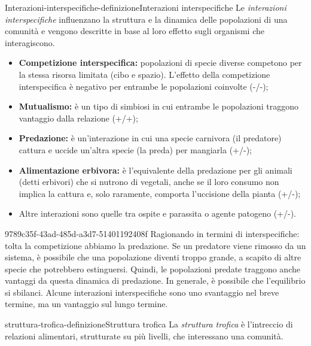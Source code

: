 \documentclass[preview]{standalone}
\begin{document}
\begin{snippetdefinition}{Interazioni-interspecifiche-definizione}{Interazioni interspecifiche}
    Le \textit{interazioni interspecifiche} influenzano la struttura e la
    dinamica delle popolazioni di una comunità e vengono
    descritte in base al loro effetto sugli organismi che
    interagiscono.
    \begin{itemize}
        \item \textbf{Competizione interspecifica:} popolazioni di specie diverse
            competono per la stessa risorsa limitata (cibo e spazio).
            L'effetto della competizione interspecifica è negativo per
            entrambe le popolazioni coinvolte (-/-);
        \item \textbf{Mutualismo:} è un tipo di simbiosi in cui entrambe le
            popolazioni traggono vantaggio dalla relazione (+/+);
        \item \textbf{Predazione:} è un'interazione in cui una specie carnivora
            (il predatore) cattura e uccide un'altra specie (la preda)
            per mangiarla (+/-);
        \item \textbf{Alimentazione erbivora:} è l'equivalente della predazione
            per gli animali (detti erbivori) che si nutrono di vegetali,
            anche se il loro consumo non implica la cattura e, solo
            raramente, comporta l'uccisione della pianta (+/-);
        \item Altre interazioni sono quelle tra ospite e parassita o agente patogeno (+/-).
    \end{itemize}
\end{snippetdefinition}

\begin{snippet}{9789c35f-43ad-485d-a3d7-51401192408f}
    Ragionando in termini di interspecifiche: tolta la competizione abbiamo la predazione.
    Se un predatore viene rimosso da un sistema, è possibile che una popolazione diventi
    troppo grande, a scapito di altre specie che potrebbero estinguersi.
    Quindi, le popolazioni predate traggono anche vantaggi da questa dinamica di predazione.
    In generale, è possibile che l'equilibrio si sbilanci.
    Alcune interazioni interspecifiche sono uno svantaggio nel breve termine, ma un vantaggio sul lungo termine.
\end{snippet}

\begin{snippetdefinition}{struttura-trofica-definizione}{Struttura trofica}
    La \textit{struttura trofica} è l'intreccio di relazioni alimentari,
    strutturate su più livelli, che interessano una comunità.
\end{snippetdefinition}
\end{document}
